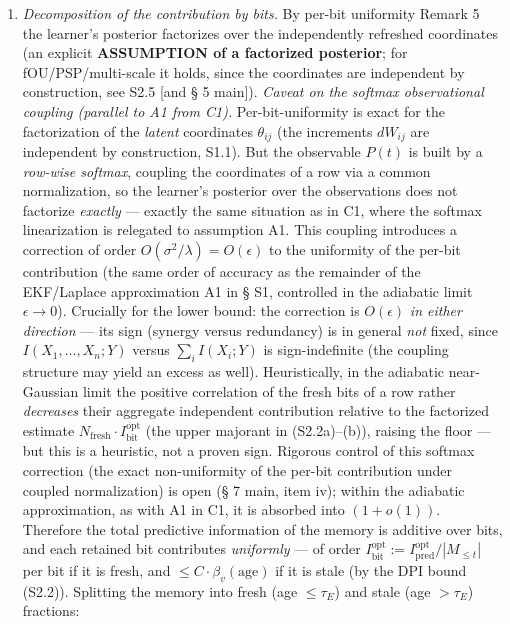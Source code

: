 \documentclass[12pt]{iopart}
\providecommand{\tightlist}{\setlength{\itemsep}{0pt}\setlength{\parskip}{0pt}}
\begin{document}
\begin{enumerate}

\def\labelenumi{(\alph{enumi})}

\tightlist

\item

  \emph{Decomposition of the contribution by bits.} By per-bit uniformity \cite{Andriishin2026b} Remark 5 the learner's posterior factorizes over the independently refreshed coordinates (an explicit \textbf{ASSUMPTION of a factorized posterior}; for fOU/PSP/multi-scale it holds, since the coordinates are independent by construction, see S2.5 {[}and § 5 main{]}). \emph{Caveat on the softmax observational coupling (parallel to A1 from C1).} Per-bit-uniformity is exact for the factorization of the \emph{latent} coordinates \(\theta_{ij}\) (the increments \(dW_{ij}\) are independent by construction, S1.1). But the observable \(P(t)\) is built by a \emph{row-wise softmax}, coupling the coordinates of a row via a common normalization, so the learner's posterior over the observations does not factorize \emph{exactly} --- exactly the same situation as in C1, where the softmax linearization is relegated to assumption A1. This coupling introduces a correction of order \(O(\sigma^2/\lambda) = O(\epsilon)\) to the uniformity of the per-bit contribution (the same order of accuracy as the remainder of the EKF/Laplace approximation A1 in § S1, controlled in the adiabatic limit \(\epsilon \to 0\)). Crucially for the lower bound: the correction is \(O(\epsilon)\) \emph{in either direction} --- its sign (synergy versus redundancy) is in general \emph{not} fixed, since \(I(X_1,\dots,X_n;Y)\) versus \(\sum_i I(X_i;Y)\) is sign-indefinite (the coupling structure may yield an excess as well). Heuristically, in the adiabatic near-Gaussian limit the positive correlation of the fresh bits of a row rather \emph{decreases} their aggregate independent contribution relative to the factorized estimate \(N_{\text{fresh}}\cdot I^{\text{opt}}_{\text{bit}}\) (the upper majorant in (S2.2a)--(b)), raising the floor --- but this is a heuristic, not a proven sign. Rigorous control of this softmax correction (the exact non-uniformity of the per-bit contribution under coupled normalization) is open (§ 7 main, item iv); within the adiabatic approximation, as with A1 in C1, it is absorbed into \((1+o(1))\). Therefore the total predictive information of the memory is additive over bits, and each retained bit contributes \emph{uniformly} --- of order \(I^{\text{opt}}_{\text{bit}} := I_{\text{pred}}^{\text{opt}}/|M_{\le t}|\) per bit if it is fresh, and \(\le C\cdot\beta_v(\text{age})\) if it is stale (by the DPI bound (S2.2)). Splitting the memory into fresh (age \(\le \tau_E\)) and stale (age \(> \tau_E\)) fractions:

\end{enumerate}
\end{document}
